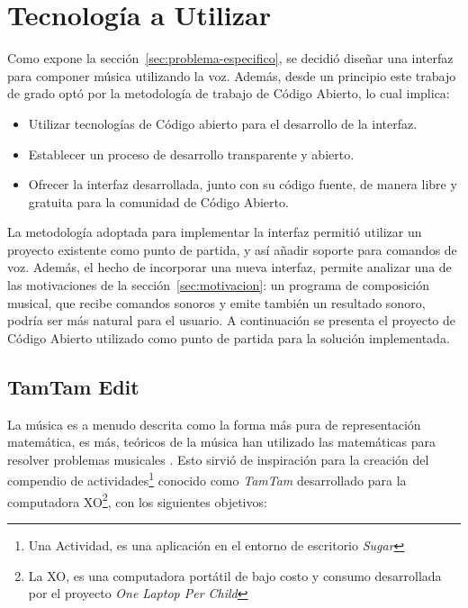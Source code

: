 \section{Tecnolog\'ia a Utilizar}
\label{sec:tecnologia-utilizada}

Como expone la secci\'on~\ref{sec:problema-especifico}, se decidi\'o dise\~nar
una interfaz para componer m\'usica utilizando la voz. Adem\'as, desde un principio
este trabajo de grado opt\'o por la metodolog\'ia de trabajo
de C\'odigo Abierto, lo cual implica: 

\begin{itemize}
    \item Utilizar tecnolog\'ias de C\'odigo abierto para el desarrollo de la interfaz.
    \item Establecer un proceso de desarrollo transparente y abierto.
    \item Ofrecer la interfaz desarrollada, junto con su código fuente, de manera libre 
        y gratuita para la comunidad de Código Abierto.
\end{itemize}

La metodolog\'ia adoptada para implementar la interfaz permiti\'o utilizar un proyecto
existente como punto de partida, y as\'i a\~nadir soporte para comandos de voz. Adem\'as,
el hecho de incorporar una nueva interfaz, permite analizar
una de las motivaciones de la secci\'on~\ref{sec:motivacion}: un programa de composici\'on
musical, que recibe comandos sonoros y emite tambi\'en un resultado sonoro, podr\'ia ser
m\'as natural para el usuario. A continuaci\'on se presenta el proyecto de C\'odigo Abierto
utilizado como punto de partida para la soluci\'on implementada.

\subsection{TamTam Edit}

La m\'usica es a menudo descrita como la forma m\'as pura de representaci\'on matem\'atica, es m\'as, te\'oricos de la
m\'usica han utilizado las matem\'aticas para resolver problemas musicales \cite{TheSoundOfNumbers}. Esto sirvi\'o
de inspiraci\'on para la creaci\'on del compendio de actividades\footnote{Una Actividad, es una aplicaci\'on en el entorno 
de escritorio \emph{Sugar}}
conocido como \emph{TamTam} desarrollado para la computadora XO\footnote{La XO, es una computadora 
port\'atil de bajo costo y consumo desarrollada por el proyecto \emph{One Laptop Per Child}},
con los siguientes objetivos:

